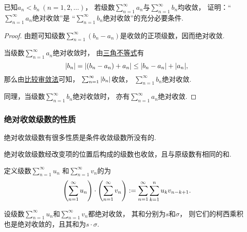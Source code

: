 \begin{example}
已知\(a_n < b_n\ (n=1,2,\dotsc)\)，
若级数\(\sum_{n=1}^\infty a_n\)与\(\sum_{n=1}^\infty b_n\)均收敛，
证明：“\(\sum_{n=1}^\infty a_n\)绝对收敛”是
“\(\sum_{n=1}^\infty b_n\)绝对收敛”的充分必要条件.
\begin{proof}
由题可知级数\(\sum_{n=1}^\infty (b_n - a_n)\)是收敛的正项级数，因而绝对收敛.

当级数\(\sum_{n=1}^\infty a_n\)绝对收敛时，
由\hyperref[theorem:不等式.三角不等式1]{三角不等式}有\[
	\abs{b_n} = \abs{(b_n - a_n) + a_n}
	\leq \abs{b_n - a_n} + \abs{a_n},
\]
那么由\hyperref[theorem:无穷级数.正项级数的比较审敛法]{比较审敛法}可知，
\(\sum_{n=1}^\infty \abs{b_n}\)收敛，
\(\sum_{n=1}^\infty b_n\)绝对收敛.

同理，当级数\(\sum_{n=1}^\infty b_n\)绝对收敛时，
亦有\(\sum_{n=1}^\infty a_n\)绝对收敛.
\end{proof}
\end{example}

\subsubsection{绝对收敛级数的性质}
绝对收敛级数有很多性质是条件收敛级数所没有的.

\begin{property}[绝对收敛级数的可交换性]\label{theorem:无穷级数.绝对收敛级数的可交换性}
绝对收敛级数经改变项的位置后构成的级数也收敛，且与原级数有相同的和.
\end{property}

\begin{definition}\label{definition:无穷级数.绝对收敛级数的柯西乘积}
定义级数\(\sum_{n=1}^\infty u_n\)
和\(\sum_{n=1}^\infty v_n\)的为\[
	\left( \sum_{n=1}^\infty u_n \right)
	\cdot
	\left( \sum_{n=1}^\infty v_n \right)
	:=
	\sum_{n=1}^\infty \sum_{k=1}^n u_k v_{n-k+1}.
\]
\end{definition}

\begin{theorem}\label{theorem:无穷级数.绝对收敛级数的柯西乘积必收敛}
设级数\(\sum_{n=1}^\infty u_n\)和\(\sum_{n=1}^\infty v_n\)都绝对收敛，
其和分别为\(s\)和\(\sigma\)，
则它们的柯西乘积也是绝对收敛的，且其和为\(s \cdot \sigma\).
\end{theorem}

